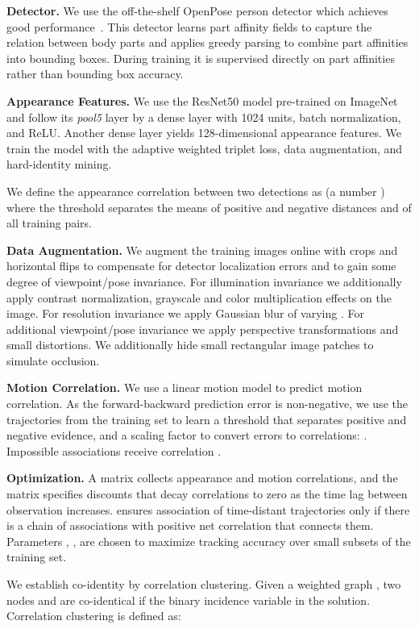 \documentclass[10pt,twocolumn,letterpaper]{article}
\begin{document}
\noindent\textbf{Detector.} We use the off-the-shelf OpenPose person detector which achieves good performance~\cite{cao2017realtime}. This detector learns part affinity fields to capture the relation between body parts and applies greedy parsing to combine part affinities into bounding boxes. During training it is supervised directly on part affinities rather than bounding box accuracy.


\noindent\textbf{Appearance Features.} We use the ResNet50 model pre-trained on ImageNet and follow its \textit{pool5} layer by a dense layer with 1024 units, batch normalization, and ReLU. Another dense layer yields 128-dimensional appearance features. We train the model with the adaptive weighted triplet loss, data augmentation, and hard-identity mining.

We define the appearance correlation between two detections as  (a number ) where the threshold  separates the means of positive and negative distances  and  of all training pairs.

\noindent\textbf{Data Augmentation.} We augment the training images online with crops and horizontal flips to compensate for detector localization errors and to gain some degree of viewpoint/pose invariance. For illumination invariance we additionally apply contrast normalization, grayscale and color multiplication effects on the image. For resolution invariance we apply Gaussian blur of varying . For additional viewpoint/pose invariance we apply perspective transformations and small distortions. We additionally hide small rectangular image patches to simulate occlusion.

\noindent\textbf{Motion Correlation.} We use a linear motion model to predict motion correlation. As the forward-backward prediction error  is non-negative, we use the trajectories from the training set to learn a threshold  that separates positive and negative evidence, and a scaling factor  to convert errors to correlations: . Impossible associations receive correlation .

\noindent\textbf{Optimization.} A matrix  collects appearance and motion correlations, and the matrix  specifies discounts  that decay correlations to zero as the time lag  between observation increases.  ensures association of time-distant trajectories only if there is a chain of associations with positive net correlation that connects them. Parameters , ,  are chosen to maximize tracking accuracy over small subsets of the training set.


We establish co-identity by correlation clustering. Given a weighted graph , two nodes  and  are co-identical if the binary incidence variable  in the solution. Correlation clustering is defined as:
\end{document}
